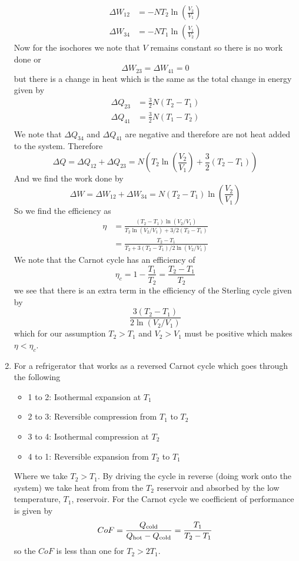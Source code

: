 \documentclass[11pt]{article}
\numberwithin{equation}{section}
\begin{document}
\begin{enumerate}[(1)]
\begin{align*}
\Delta{W}_{12} &= -NT_2\ln\left(\frac{V_2}{V_1}\right)\\
\Delta{W}_{34} &= -NT_1\ln\left(\frac{V_1}{V_2}\right)
\end{align*}
Now for the isochores we note that $V$ remains constant so there is no work done or
$$\Delta{W}_{23} = \Delta{W}_{41} = 0$$
but there is a change in heat which is the same as the total change in energy given by
\begin{align*}
\Delta{Q}_{23} &= \frac{3}{2}N(T_2-T_1)\\
\Delta{Q}_{41} &= \frac{3}{2}N(T_1-T_2)\\
\end{align*}
We note that $\Delta{Q}_{34}$ and $\Delta{Q}_{41}$ are negative and therefore are not heat added to
the system. Therefore
$$\Delta{Q} = \Delta{Q}_{12} + \Delta{Q}_{23} = N\left(T_2\ln\left(\frac{V_2}{V_1}\right) + \frac{3}{2}(T_2-T_1)\right)$$
And we find the work done by
$$\Delta{W} = \Delta{W}_{12} + \Delta{W}_{34} = N(T_2-T_1)\ln\left(\frac{V_2}{V_1}\right)$$
So we find the efficiency as
\begin{align*}
\eta &= \frac{(T_2-T_1)\ln(V_2/V_1)}{T_2\ln\left({V_2}/{V_1}\right) + 3/2(T_2-T_1)}\\
&= \frac{T_2-T_1}{T_2+3(T_2-T_1)/2\ln(V_2/V_1)}
\end{align*}
We note that the Carnot cycle has an efficiency of
$$\eta_{c} = 1-\frac{T_1}{T_2} = \frac{T_2-T_1}{T_2}$$
we see that there is an extra term in the efficiency of the Sterling cycle given by
$$\frac{3(T_2-T_1)}{2\ln(V_2/V_1)}$$
which for our assumption $T_2>T_1$ and $V_2>V_1$ must be positive which makes $\eta<\eta_c$.

\item 
For a refrigerator that works as a reversed Carnot cycle which goes through the following
\begin{itemize}
\item 1 to 2: Isothermal expansion at $T_1$
\item 2 to 3: Reversible compression from $T_1$ to $T_2$
\item 3 to 4: Isothermal compression at $T_2$ 
\item 4 to 1: Reversible expansion from $T_2$ to $T_1$ 
\end{itemize}
Where we take $T_2>T_1$. By driving the cycle in reverse (doing work onto the system) we take
heat from from the $T_2$ reservoir and absorbed by the low temperature, $T_1$, reservoir. For
the Carnot cycle we coefficient of performance is given by
$$CoF = \frac{Q_{\textnormal{cold}}}{Q_{\textnormal{hot}}-Q_\textnormal{cold}} = \frac{T_1}{T_2-T_1}$$
so the $CoF$ is less than one for $T_2>2T_1$.
\end{enumerate}
\end{document}
